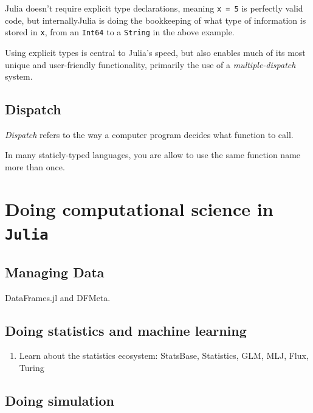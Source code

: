\documentclass[11pt]{article}
\begin{document}
Julia doesn't require explicit type declarations, meaning
\texttt{x\ =\ 5} is perfectly valid code, but internallyJulia is doing
the bookkeeping of what type of information is stored in \texttt{x},
from an \texttt{Int64} to a \texttt{String} in the above example.

Using explicit types is central to Julia's speed, but also enables much
of its most unique and user-friendly functionality, primarily the use of
a \emph{multiple-dispatch} system.

\hypertarget{dispatch}{%
\subsection{Dispatch}\label{dispatch}}

\emph{Dispatch} refers to the way a computer program decides what
function to call.

In many staticly-typed languages, you are allow to use the same function
name more than once.

\hypertarget{doing-computational-science-in-julia}{%
\section{\texorpdfstring{Doing computational science in
\texttt{Julia}}{Doing computational science in Julia}}\label{doing-computational-science-in-julia}}

\hypertarget{managing-data}{%
\subsection{Managing Data}\label{managing-data}}

DataFrames.jl and DFMeta.

\hypertarget{doing-statistics-and-machine-learning}{%
\subsection{Doing statistics and machine
learning}\label{doing-statistics-and-machine-learning}}

\begin{enumerate}
\def\labelenumi{\arabic{enumi}.}
\setcounter{enumi}{6}
\tightlist
\item
  Learn about the statistics ecosystem: StatsBase, Statistics, GLM, MLJ,
  Flux, Turing
\end{enumerate}

\hypertarget{doing-simulation}{%
\subsection{Doing simulation}\label{doing-simulation}}
\end{document}
